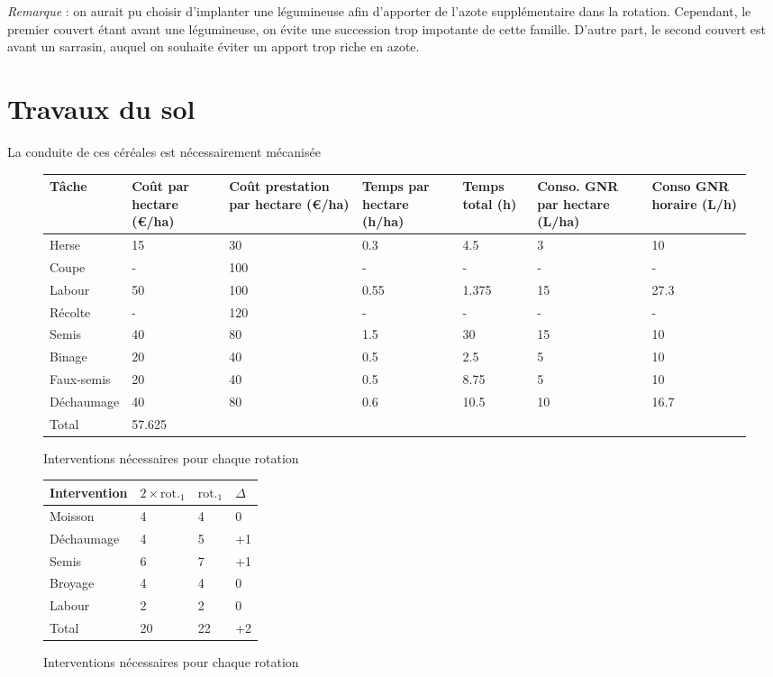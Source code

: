 \documentclass{book}
\begin{document}
\textit{Remarque} : on aurait pu choisir d'implanter une légumineuse afin d'apporter de l'azote supplémentaire dans la rotation. Cependant, le premier couvert étant avant une légumineuse, on évite une succession trop impotante de cette famille. D'autre part, le second couvert est avant un sarrasin, auquel on souhaite éviter un apport trop riche en azote.

\section{Travaux du sol}

La conduite de ces céréales est nécessairement mécanisée

\begin{figure}[h!]
\center
\begin{tabular}{ | p{2cm} | p{2cm}| p{2cm}| p{2cm} | p{} | p{2cm} | p{2cm}| }
\hline
	Tâche & Coût par hectare (\euro{}/ha) & Coût prestation par hectare (\euro{}/ha) & Temps par hectare (h/ha) & Temps total (h) & Conso. GNR par hectare (L/ha) & Conso GNR horaire (L/h) \\ \hline
	Herse & 15 & 30 & 0.3 & 4.5 & 3 & 10 \\ \hline
	Coupe & - & 100 & - & - & - & - \\ \hline
	Labour & 50 & 100 & 0.55 & 1.375 & 15 & 27.3 \\ \hline
	Récolte & - & 120 & - & - & - & - \\ \hline
	Semis & 40 & 80 & 1.5 & 30 & 15 & 10 \\ \hline
	Binage & 20 & 40 & 0.5 & 2.5 & 5 & 10 \\ \hline
	Faux-semis & 20 & 40 & 0.5 & 8.75 & 5 & 10 \\ \hline
	Déchaumage & 40 & 80 & 0.6 & 10.5 & 10 & 16.7 \\ \hline
	Total & 57.625 & \  & \  & \  & \  & \  \\ \hline
\end{tabular}
\caption{Interventions nécessaires pour chaque rotation}
\label{tab:compa_rot}
\end{figure}

\begin{figure}[h!]
\center
\begin{tabular}{|p{3cm}|p{2cm}|p{2cm}|p{2cm}|}
\hline
Intervention & $2\times\mathrm{rot._1}$ & $\mathrm{rot._1}$ & $\Delta$ \\
\hline
Moisson &  4 & 4 & 0  \\
\hline
Déchaumage & 4 & 5 & +1 \\
\hline
Semis & 6 & 7 & +1\\
\hline
Broyage & 4 & 4 & 0\\
\hline
Labour & 2 & 2 & 0 \\
\hline
Total & 20 & 22 & +2\\
\hline
\end{tabular}
\caption{Interventions nécessaires pour chaque rotation}
\label{tab:compa_rot}
\end{figure}
\end{document}
